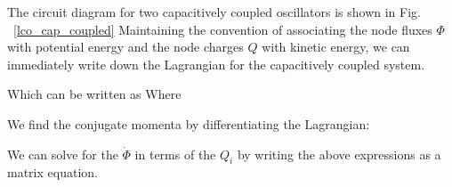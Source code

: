 The circuit diagram for two capacitively coupled oscillators is shown in Fig.\,~\ref{lco_cap_coupled}
Maintaining the convention of associating the node fluxes $\Phi$ with potential energy and the node charges $Q$ with kinetic energy,
we can immediately write down the Lagrangian for the capacitively coupled system.

Which can be written as
\noindent
Where

We find the conjugate momenta by differentiating the Lagrangian:

We can solve for the $\dot{\Phi}$ in terms of the $Q_i$ by writing the above expressions as a matrix equation.


